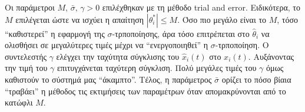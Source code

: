 \documentclass[a4paper,12pt]{article}
\begin{document}
Οι παράμετροι $M, \, \bar{\sigma}, \, \gamma > 0$ επιλέχθηκαν με τη μέθοδο
trial and error.
Ειδικότερα, το $M$ επιλέγεται ώστε να ισχύει η απαίτηση $|\theta_i^*| \leq M$. Όσο πιο μεγάλο είναι το $M$,
τόσο ``καθιστερεί'' η εφαρμογή της $\sigma$-τρποποίησης, άρα τόσο επιτρέπεται στο $\hat{\theta}_i$ να ολισθήσει
σε μεγαλύτερες τιμές μέχρι να ``ενεργοποιηθεί'' η $\sigma$-τρποποίηση. Ο συντελεστής $\gamma$ ελέγχει την 
ταχύτητα σύγκλισης του $\hat{x}_i(t)$ στο $x_i(t)$. Αυξάνοντας την τιμή του $\gamma$ επιτυγχάνεται ταχύτερη
σύγκλιση. Πολύ μεγάλες τιμές του $\gamma$ όμως καθιστούν το σύστημά μας ``άκαμπτο''. Τέλος, η παράμετρος
$\bar{\sigma}$ ορίζει το πόσο βίαια ``τραβάει'' η μέθοδος τις εκτιμήσεις των παραμέτρων όταν απομακρύνονται 
από το κατώφλι $M$.
\end{document}
